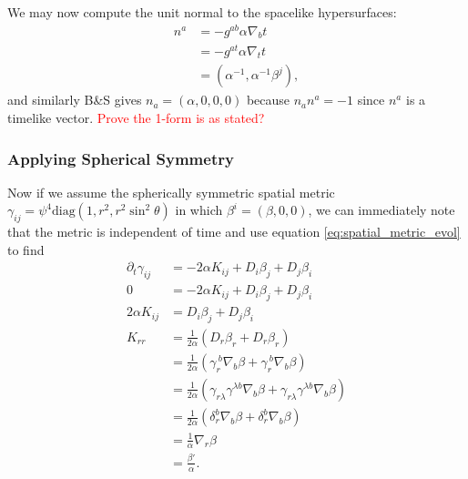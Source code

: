 \documentclass[12pt]{article}
\numberwithin{equation}{section}
\newcommand{\redtext}[1]{\textcolor{red}{#1}}
\begin{document}
We may now compute the unit normal to the spacelike hypersurfaces:
\begin{equation}
\begin{aligned}
n^a &= -g^{ab} \alpha \nabla_b t \\
&= -g^{a t} \alpha \nabla_t t \\
&= (\alpha^{-1}, \alpha^{-1} \beta^{j}),
\end{aligned}
\end{equation}
and similarly B\&S gives $n_a = (\alpha, 0, 0, 0)$ because $n_a n^a = -1$ since $n^a$ is a timelike vector. \redtext{Prove the 1-form is as stated?}

\subsubsection{Applying Spherical Symmetry}
Now if we assume the spherically symmetric spatial metric $\gamma_{ij} = \psi^4 \mathrm{diag}(1, r^2, r^2 \sin^2 \theta)$ in which $\beta^i = (\beta, 0, 0)$, we can immediately note that the metric is independent of time and use equation \ref{eq:spatial_metric_evol} to find
\begin{equation}
\begin{aligned}
\partial_t \gamma_{ij} &= -2 \alpha K_{ij} + D_i \beta_j + D_j \beta_i \\
0 &= -2 \alpha K_{ij} + D_i \beta_j + D_j \beta_i \\
2 \alpha K_{ij} &= D_i \beta_j + D_j \beta_i \\
K_{rr} &= \frac{1}{2 \alpha} (D_r \beta_r + D_r \beta_r) \\
&= \frac{1}{2 \alpha} (\gamma_{r}^{~b} \nabla_b \beta + \gamma_{r}^{~b} \nabla_b \beta) \\
&= \frac{1}{2 \alpha} (\gamma_{r \lambda} \gamma^{\lambda b} \nabla_b \beta + \gamma_{r \lambda} \gamma^{\lambda b} \nabla_b \beta) \\
&= \frac{1}{2 \alpha} (\delta^{b}_r \nabla_b \beta + \delta^{b}_r \nabla_b \beta) \\
&= \frac{1}{\alpha} \nabla_r \beta \\
&= \frac{\beta'}{\alpha}.
\end{aligned}
\end{equation} 
\end{document}
